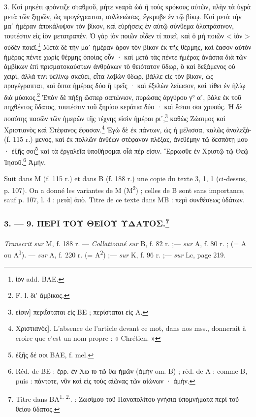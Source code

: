 \documentclass[landscape, a4paper, 11pt, oneside, polutonikogreek, french]{article}
\begin{document}
3. Καὶ μηκέτι φρόντιζε σταθμοῦ, μήτε νεαρὰ ὠὰ ἢ τοὺς κρόκους αὐτῶν, πλὴν τὰ ὑγρὰ μετὰ τῶν ξηρῶν, ὡς προγέγραπται, συλλειώσας, ἔγκρυβε ἐν τῷ βίκῳ. Καὶ μετὰ τὴν μαʹ ἡμέραν ἀποκάλυψον τὸν βίκον, καὶ εὑρήσεις ἐν αὐτῷ σύνθεμα ὁλοπράσινον, τουτέστιν εἰς ἰὸν μετατραπέν. Ὁ γὰρ ἰὸν ποιῶν οἶδεν τί ποιεῖ, καὶ ὁ μὴ ποιῶν < ἰὸν > οὐδὲν ποιεῖ.\footnote{ἰὸν add. BAE.} Μετὰ δὲ τὴν μαʹ ἡμέραν ἄρον τὸν βίκον ἐκ τῆς θέρμης, καὶ ἔασον αὐτὸν ἡμέρας πέντε χωρὶς θέρμης ὁποίας οὖν · καὶ μετὰ τὰς πέντε ἡμέρας ἀνάσπα διὰ τῶν ἀμβίκων ἐπὶ πρισματοκαύστων ἀνθράκων τὸ θειότατον ὕδωρ, ὃ καὶ δεξάμενος οὐ χειρὶ, ἀλλά τινι ὑελίνῳ σκεύει, εἶτα λαβὼν ὕδωρ, βάλλε εἰς τὸν βίκον, ὡς προγέγραπται, καὶ ὄπτα ἡμέρας δύο ἢ τρεῖς · καὶ ἐξελὼν λείωσον, καὶ τίθει ἐν ἡλίῳ διὰ μύακος.\footnote{F. l. δι' ἄμβικος.} Ἐπὰν δὲ πήξῃ ὥσπερ σαπώνιον, πυρώσας ἀργύρου γ° αʹ, βάλε ἐκ τοῦ πηχθέντος ὕδατος, τουτέστιν τοῦ ξηρίου κεράτια δύο · καὶ ἔσται σοι χρυσός. Ἡ δὲ ποσότης πασῶν τῶν ἡμερῶν τῆς τέχνης εἰσὶν ἡμέραι ριʹ,\footnote{εἰσιν] περιΐσταται εἰς BE ; περίσταται εἰς A.} καθὼς Ζώσιμος καὶ Χριστιανὸς καὶ Στέφανος ἔφασαν.\footnote{Χριστιανὸς]. L'absence de l'article devant ce mot, dans nos mss., donnerait à croire que c'est un nom propre : « Chrétien. »} Ἐγὼ δὲ ἐκ πάντων, ὡς ἡ μέλισσα, καλῶς ἀναλεξά- (f. 115 r.) μενος, καὶ ἐκ πολλῶν ἀνθέων στέφανον πλέξας, ἀνεθέμην τῷ δεσπότῃ μου · ἑξῆς σοι\footnote{ἑξῆς δέ σοι BAE, f. mel.} καὶ τὰ ἐργαλεῖα ὑποθήσομαι οἷά πέρ εἰσιν. Ἔρρωσθε ἐν Χριστῷ τῷ Θεῷ Ἰησοῦ.\footnote{Réd. de BE : ἔρρ. ἐν Χω ιυ τῶ θω ἡμῶν (ἀμήν om. B) ; réd. de A : comme B, puis : πάντοτε, νῦν καὶ εἰς τοὺς αἰῶνας τῶν αἰώνων · ἀμήν.} Ἀμήν.

Suit dans M (f. 115 r.) et dans B (f. 188 r.) une copie du texte 3, 1, 1 (ci-dessus, p. 107). On a donné les variantes de M (M\textsuperscript{2}) ; celles de B sont sans importance, sauf p. 107, l. 4 : μετὰ] ἀπὸ. Titre de ce texte dans MB : περὶ συνθέσεως ὑδάτων.

\bigskip
\centerline{\EightStarTaper}
\centerline{\EightStarTaper\EightStarTaper}
\bigskip

\subsubsection[3. --- 9. ΠΕΡΙ ΤΟΥ ΘΕΙΟΥ ΥΔΑΤΟΣ.]{3. --- 9. ΠΕΡΙ ΤΟΥ ΘΕΙΟΥ ΥΔΑΤΟΣ.\footnote{Titre dans BA\textsuperscript{1. 2.}. : Ζωσίμου τοῦ Πανοπολίτου γνήσια ὑπομνήματα περὶ τοῦ θείου ὕδατος.}}
\paragraph{}
\emph{Transcrit sur} M, f. 188 r. --- \emph{Collationné sur} B, f. 82 r. ;--- \emph{sur} A, f. 80 r. ; (= A ou A\textsuperscript{1}). --- \emph{sur} A, f. 220 r. (= A\textsuperscript{2}) ;--- \emph{sur} K, f. 96 r. ;--- \emph{sur} Lc, page 219.
\end{document}
